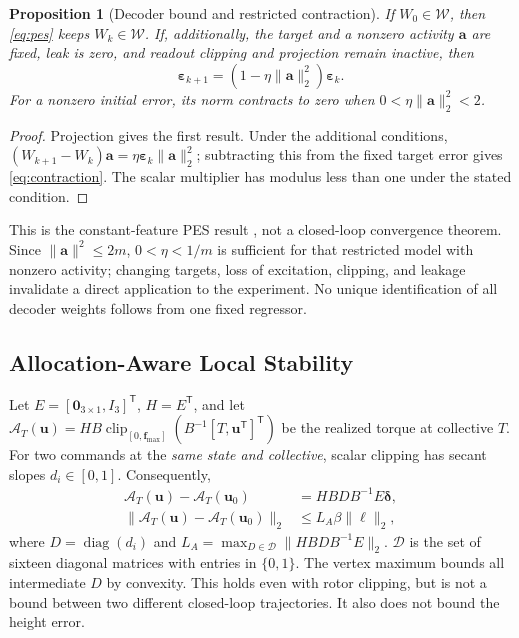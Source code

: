 \documentclass[letterpaper, 10 pt, conference]{ieeeconf}
\newcommand{\T}{^{\mathsf T}}
\newcommand{\clip}{\operatorname{clip}}
\newtheorem{proposition}{Proposition}
\begin{document}
\begin{proposition}[Decoder bound and restricted contraction]
\label{prop:pes}
If $W_0\in\mathcal W$, then \eqref{eq:pes} keeps $W_k\in\mathcal W$.
If, additionally, the target and a nonzero activity $\bm a$ are fixed,
leak is zero, and readout clipping and projection remain inactive, then
\begin{equation}
 \bm\varepsilon_{k+1}
       =(1-\eta\|\bm a\|_2^2)\bm\varepsilon_k.
 \label{eq:contraction}
\end{equation}
For a nonzero initial error, its norm contracts to zero when
$0<\eta\|\bm a\|_2^2<2$.
\end{proposition}
\begin{proof}
Projection gives the first result. Under the additional conditions,
$(W_{k+1}-W_k)\bm a=\eta\bm\varepsilon_k\|\bm a\|_2^2$;
subtracting this from the fixed target error gives
\eqref{eq:contraction}. The scalar multiplier has modulus less than one
under the stated condition.
\end{proof}
This is the constant-feature PES result \cite{voelker2015pes}, not a
closed-loop convergence theorem. Since $\|\bm a\|^2\le2m$,
$0<\eta<1/m$ is sufficient for that restricted model with nonzero
activity; changing targets, loss of excitation, clipping, and leakage
invalidate a direct application to the experiment. No unique identification
of all decoder weights follows from one fixed regressor.

\subsection{Allocation-Aware Local Stability}
\label{sec:local}
Let $E=[\bm0_{3\times1},I_3]\T$, $H=E\T$, and let
$\mathcal A_T(\bm u)=HB\clip_{[0,\bm f_{\max}]}(B^{-1}[T,\bm u\T]\T)$
be the realized torque at collective $T$. For two commands at the
\emph{same state and collective}, scalar clipping has secant slopes
$d_i\in[0,1]$. Consequently,
\begin{align}
 \mathcal A_T(\bm u)-\mathcal A_T(\bm u_0)
 &=HBDB^{-1}E\bm\delta,\\
 \|\mathcal A_T(\bm u)-\mathcal A_T(\bm u_0)\|_2
 &\le L_A\beta\|\bm\ell\|_2,
 \label{eq:allocbound}
\end{align}
where $D=\operatorname{diag}(d_i)$ and
$L_A=\max_{D\in\mathcal D}\|HBDB^{-1}E\|_2$.
$\mathcal D$ is the set of sixteen diagonal matrices with entries
in $\{0,1\}$. The vertex maximum bounds all intermediate $D$ by convexity.
This holds even with rotor clipping, but is not a bound between two
different closed-loop trajectories. It also does not bound the height error.
\end{document}
